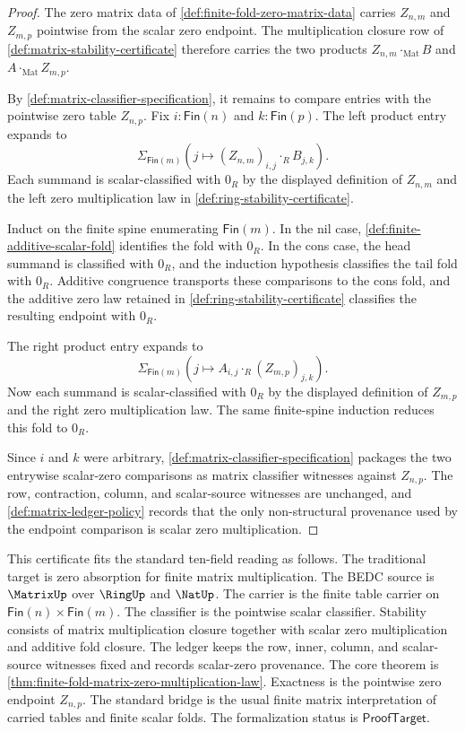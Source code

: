 \begin{proof}
The zero matrix data of \autoref{def:finite-fold-zero-matrix-data} carries $Z_{n,m}$ and $Z_{m,p}$ pointwise from the scalar zero endpoint. The multiplication closure row of \autoref{def:matrix-stability-certificate} therefore carries the two products $Z_{n,m}\cdot_{\mathrm{Mat}}B$ and $A\cdot_{\mathrm{Mat}}Z_{m,p}$.

By \autoref{def:matrix-classifier-specification}, it remains to compare entries with the pointwise zero table $Z_{n,p}$. Fix $i:\mathsf{Fin}(n)$ and $k:\mathsf{Fin}(p)$. The left product entry expands to
$$
\Sigma_{\mathsf{Fin}(m)}(j\mapsto (Z_{n,m})_{i,j}\cdot_RB_{j,k}).
$$
Each summand is scalar-classified with $0_R$ by the displayed definition of $Z_{n,m}$ and the left zero multiplication law in \autoref{def:ring-stability-certificate}.

Induct on the finite spine enumerating $\mathsf{Fin}(m)$. In the nil case, \autoref{def:finite-additive-scalar-fold} identifies the fold with $0_R$. In the cons case, the head summand is classified with $0_R$, and the induction hypothesis classifies the tail fold with $0_R$. Additive congruence transports these comparisons to the cons fold, and the additive zero law retained in \autoref{def:ring-stability-certificate} classifies the resulting endpoint with $0_R$.

The right product entry expands to
$$
\Sigma_{\mathsf{Fin}(m)}(j\mapsto A_{i,j}\cdot_R(Z_{m,p})_{j,k}).
$$
Now each summand is scalar-classified with $0_R$ by the displayed definition of $Z_{m,p}$ and the right zero multiplication law. The same finite-spine induction reduces this fold to $0_R$.

Since $i$ and $k$ were arbitrary, \autoref{def:matrix-classifier-specification} packages the two entrywise scalar-zero comparisons as matrix classifier witnesses against $Z_{n,p}$. The row, contraction, column, and scalar-source witnesses are unchanged, and \autoref{def:matrix-ledger-policy} records that the only non-structural provenance used by the endpoint comparison is scalar zero multiplication.
\end{proof}

This certificate fits the standard ten-field reading as follows. The traditional target is zero absorption for finite matrix multiplication. The BEDC source is $\MatrixUp$ over $\RingUp$ and $\NatUp$. The carrier is the finite table carrier on $\mathsf{Fin}(n)\times\mathsf{Fin}(m)$. The classifier is the pointwise scalar classifier. Stability consists of matrix multiplication closure together with scalar zero multiplication and additive fold closure. The ledger keeps the row, inner, column, and scalar-source witnesses fixed and records scalar-zero provenance. The core theorem is \autoref{thm:finite-fold-matrix-zero-multiplication-law}. Exactness is the pointwise zero endpoint $Z_{n,p}$. The standard bridge is the usual finite matrix interpretation of carried tables and finite scalar folds. The formalization status is $\mathsf{ProofTarget}$.

